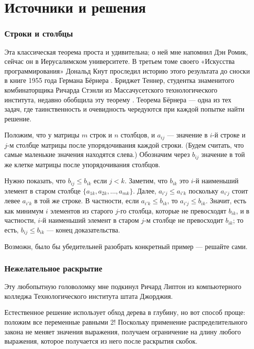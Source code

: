 \section*{Источники и решения}

\subsubsection*{Строки и столбцы}

Эта классическая теорема проста и удивительна; о ней мне напомнил Дэн Ромик, сейчас он в Иерусалимском университете.
В третьем томе своего «Искусства программирования» \cite{41} Дональд Кнут проследил историю этого результата до сноски в книге 1955 года Германа Бёрнера \cite{7}.
Бриджет Теннер, студентка знаменитого комбинаторщика Ричарда Стэнли из Массачусетского технологического института, недавно обобщила эту теорему \cite{57}.
Теорема Бёрнера --- одна из тех задач, где таинственность и очевидность чередуются при каждой попытке найти решение.

Положим, что у матрицы $m$ строк и $n$ столбцов, и $a_{ij}$ --- значение в $i$-й строке и $j$-м столбце матрицы после упорядочивания каждой строки.
(Будем считать, что самые маленькие значения находятся слева.)
Обозначим через $b_{ij}$ значение в той же клетке матрицы после упорядочивания столбцов.

Нужно показать, что $b_{ij} \le b_{ik}$ если $j < k$.
Заметим, что $b_{ik}$ это $i$-й наименьший элемент в старом столбце $\{a_{1k}, a_{2k}, \dots, a_{mk}\}$.
Далее, $a_{i'j}\le a_{i'k}$ поскольку $a_{i'j}$ стоит левее $a_{i'k}$ в той же строке.
В частности, если $a_{i'k}\le b_{ik}$, то $a_{i'j}\le b_{ik}$.
Значит, есть как минимум $i$ элементов из старого $j$-го столбца, которые не превосходят $b_{ik}$,
и в частности, $i$-й наименьший элемент в старом $j$-м столбце не превосходит $b_{ik}$;
то есть, $b_{ij} \le b_{ik}$ --- конец доказательства.

Возможн, было бы убедительней разобрать конкретный пример --- решайте сами.

\subsubsection*{Нежелательное раскрытие}

Эту любопытную головоломку мне подкинул Ричард Липтон из компьютерного колледжа Технологического института штата Джорджия.

Естественное решение использует обход дерева в глубину, но вот способ проще:
положим все переменные равными 2!
Поскольку применение распределительного закона не меняет значения выражения, получаем ограничение на длину любого выражения, которое получается из него после раскрытия скобок.

